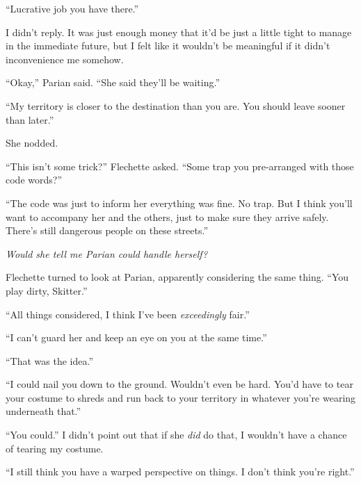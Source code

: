 ``Lucrative job you have there.''



I didn't reply.  It was just enough money that it'd be just a little tight to manage in the immediate future, but I felt like it wouldn't be meaningful if it didn't inconvenience me somehow.



``Okay,'' Parian said.  ``She said they'll be waiting.''



``My territory is closer to the destination than you are.  You should leave sooner than later.''



She nodded.



``This isn't some trick?'' Flechette asked.  ``Some trap you pre-arranged with those code words?''



``The code was just to inform her everything was fine.  No trap.  But I think you'll want to accompany her and the others, just to make sure they arrive safely.  There's still dangerous people on these streets.''



\emph{Would she tell me Parian could handle herself?}



Flechette turned to look at Parian, apparently considering the same thing.  ``You play dirty, Skitter.''



``All things considered, I think I've been \emph{exceedingly} fair.''



``I can't guard her and keep an eye on you at the same time.''



``That was the idea.''



``I could nail you down to the ground.  Wouldn't even be hard.  You'd have to tear your costume to shreds and run back to your territory in whatever you're wearing underneath that.''



``You could.''  I didn't point out that if she \emph{did} do that, I wouldn't have a chance of tearing my costume.



``I still think you have a warped perspective on things.  I don't think you're right.''



